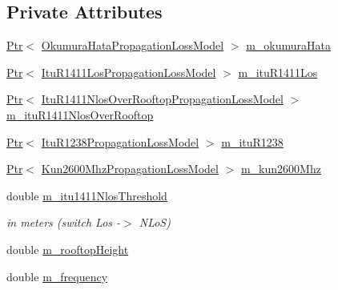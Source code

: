 \subsection*{Private Attributes}
\begin{DoxyCompactItemize}
\item 
\hyperlink{classns3_1_1Ptr}{Ptr}$<$ \hyperlink{classns3_1_1OkumuraHataPropagationLossModel}{Okumura\+Hata\+Propagation\+Loss\+Model} $>$ \hyperlink{classns3_1_1HybridBuildingsPropagationLossModel_acb20ff03479b11d6afb426603428b07d}{m\+\_\+okumura\+Hata}
\item 
\hyperlink{classns3_1_1Ptr}{Ptr}$<$ \hyperlink{classns3_1_1ItuR1411LosPropagationLossModel}{Itu\+R1411\+Los\+Propagation\+Loss\+Model} $>$ \hyperlink{classns3_1_1HybridBuildingsPropagationLossModel_a839419eadaeb5a7c9d5b05f97246384d}{m\+\_\+itu\+R1411\+Los}
\item 
\hyperlink{classns3_1_1Ptr}{Ptr}$<$ \hyperlink{classns3_1_1ItuR1411NlosOverRooftopPropagationLossModel}{Itu\+R1411\+Nlos\+Over\+Rooftop\+Propagation\+Loss\+Model} $>$ \hyperlink{classns3_1_1HybridBuildingsPropagationLossModel_a55fb528c3086dd41f8600216cfe0b80f}{m\+\_\+itu\+R1411\+Nlos\+Over\+Rooftop}
\item 
\hyperlink{classns3_1_1Ptr}{Ptr}$<$ \hyperlink{classns3_1_1ItuR1238PropagationLossModel}{Itu\+R1238\+Propagation\+Loss\+Model} $>$ \hyperlink{classns3_1_1HybridBuildingsPropagationLossModel_af0bf78c674ae816f0eecd137511073db}{m\+\_\+itu\+R1238}
\item 
\hyperlink{classns3_1_1Ptr}{Ptr}$<$ \hyperlink{classns3_1_1Kun2600MhzPropagationLossModel}{Kun2600\+Mhz\+Propagation\+Loss\+Model} $>$ \hyperlink{classns3_1_1HybridBuildingsPropagationLossModel_abe96f6ebc9a2688c95ff6af19d1db351}{m\+\_\+kun2600\+Mhz}
\item 
double \hyperlink{classns3_1_1HybridBuildingsPropagationLossModel_aa9dfb4ea7e65ff4cfb1f37c48b921ac6}{m\+\_\+itu1411\+Nlos\+Threshold}
\begin{DoxyCompactList}\small\item\em in meters (switch Los -\/$>$ N\+LoS) \end{DoxyCompactList}\item 
double \hyperlink{classns3_1_1HybridBuildingsPropagationLossModel_a36a81fabbc1c572da78ed3dbf6ba6bb8}{m\+\_\+rooftop\+Height}
\item 
double \hyperlink{classns3_1_1HybridBuildingsPropagationLossModel_a975721bfec8594e51010f194d0ec547d}{m\+\_\+frequency}
\end{DoxyCompactItemize}
